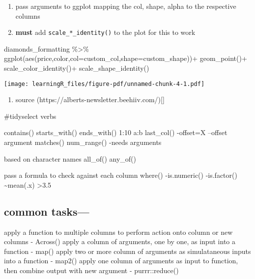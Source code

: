 \documentclass[
  letterpaper,
  DIV=11,
  numbers=noendperiod]{scrreprt}
\newenvironment{Shaded}{\begin{snugshade}}{\end{snugshade}}
\newcommand{\AttributeTok}[1]{\textcolor[rgb]{0.40,0.45,0.13}{#1}}
\newcommand{\FunctionTok}[1]{\textcolor[rgb]{0.28,0.35,0.67}{#1}}
\newcommand{\NormalTok}[1]{\textcolor[rgb]{0.00,0.23,0.31}{#1}}
\newcommand{\SpecialCharTok}[1]{\textcolor[rgb]{0.37,0.37,0.37}{#1}}
\providecommand{\tightlist}{%
  \setlength{\itemsep}{0pt}\setlength{\parskip}{0pt}}\usepackage{longtable,booktabs,array}
\begin{document}
\begin{enumerate}
\def\labelenumi{\arabic{enumi})}
\setcounter{enumi}{2}
\tightlist
\item
  pass arguments to ggplot mapping the col, shape, alpha to the
  respective columns
\item
  \textbf{must} add \texttt{scale\_*\_identity()} to the plot for this
  to work
\end{enumerate}

\begin{Shaded}
\begin{Highlighting}[]
\NormalTok{diamonds\_formatting }\SpecialCharTok{\%\textgreater{}\%} 
  \FunctionTok{ggplot}\NormalTok{(}\FunctionTok{aes}\NormalTok{(price,color,}\AttributeTok{col=}\NormalTok{custom\_col,}\AttributeTok{shape=}\NormalTok{custom\_shape))}\SpecialCharTok{+}
  \FunctionTok{geom\_point}\NormalTok{()}\SpecialCharTok{+}
  \FunctionTok{scale\_color\_identity}\NormalTok{()}\SpecialCharTok{+}
  \FunctionTok{scale\_shape\_identity}\NormalTok{()}
\end{Highlighting}
\end{Shaded}

\texttt{[image: learningR\_files/figure-pdf/unnamed-chunk-4-1.pdf]}

\begin{enumerate}
\def\labelenumi{\arabic{enumi})}
\setcounter{enumi}{4}
\tightlist
\item
  source (https://alberts-newsletter.beehiiv.com/){[}{]}
\end{enumerate}

\#tidyselect verbs

contains() starts\_with() ends\_with() 1:10 a:b last\_col() -offset=X
--offset argument matches() num\_range() -needs arguments

based on character names all\_of() any\_of()

pass a formula to check against each column where() -is.numeric()
-is.factor() \textasciitilde mean(.x) \textgreater3.5

\subsection{common tasks---}\label{common-tasks}

apply a function to multiple columns to perform action onto column or
new columns - Across() apply a column of arguments, one by one, as input
into a function - map() apply two or more column of arguments as
simulataneous inputs into a function - map2() apply one column of
arguments as input to function, then combine output with new argument -
purrr::reduce()
\end{document}

